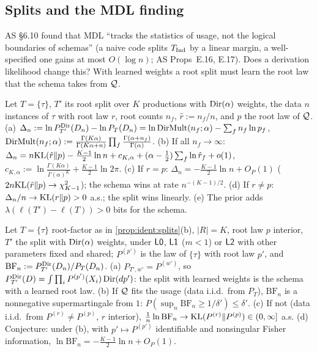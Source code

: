 \subsection{Splits and the MDL finding}\label{sec:ident:mdl}

AS \S6.10 found that MDL ``tracks the statistics of usage, not the logical boundaries of schemas'' (a naive code splits $T_{\mathrm{Ind}}$ by a linear margin, a well-specified one gains at most $O(\log n)$; AS Props~E.16, E.17). Does a derivation likelihood change this? With learned weights a root split must learn the root law that the schema takes from $\mathcal{Q}$.

\begin{proposition}\identbrk{}\label{prop:ident:splitlzero}
Let $T=\{\tau\}$, $T'$ its root split over $K$ productions with $\mathrm{Dir}(\alpha)$ weights, the data $n$ instances of $\tau$ with root law $r$, root counts $n_f$, $\hat r:=n_f/n$, and $p$ the root law of $\mathcal{Q}$.
(a) $\Delta_n:=\ln P^{\mathrm{Dir}}_{T'}(D_n)-\ln P_T(D_n)=\ln\mathrm{DirMult}(n_f;\alpha)-\sum_fn_f\ln p_f$, $\mathrm{DirMult}(n_f;\alpha):=\frac{\Gamma(K\alpha)}{\Gamma(K\alpha+n)}\prod_f\frac{\Gamma(\alpha+n_f)}{\Gamma(\alpha)}$.
(b) If all $n_f\to\infty$: $\Delta_n=n\mathrm{KL}(\hat r\|p)-\frac{K-1}2\ln n+c_{K,\alpha}+(\alpha-\frac12)\sum_f\ln\hat r_f+o(1)$, $c_{K,\alpha}:=\ln\frac{\Gamma(K\alpha)}{\Gamma(\alpha)^K}+\frac{K-1}2\ln2\pi$.
(c) If $r=p$: $\Delta_n=-\frac{K-1}2\ln n+O_P(1)$ ($2n\mathrm{KL}(\hat r\|p)\to\chi^2_{K-1}$); the schema wins at rate $n^{-(K-1)/2}$.
(d) If $r\ne p$: $\Delta_n/n\to\mathrm{KL}(r\|p)>0$ a.s.; the split wins linearly.
(e) The prior adds $\lambda(\ell(T')-\ell(T))>0$ bits for the schema.
\end{proposition}

\begin{proposition}\identbrk{}\label{prop:ident:splitlone}
Let $T=\{\tau\}$ root-factor as in \cref{prop:ident:splits}(b), $|R|=K$, root law $p$ interior, $T'$ the split with $\mathrm{Dir}(\alpha)$ weights, under $\mathord{\mathsf{L0}}$, $\mathord{\mathsf{L1}}$ ($m<1$) or $\mathord{\mathsf{L2}}$ with other parameters fixed and shared; $P^{(p')}$ is the law of $\{\tau\}$ with root law $p'$, and $\mathrm{BF}_n:=P^{\mathrm{Dir}}_{T'}(D_n)/P_T(D_n)$.
(a) $P_{T',w'}=P^{(w')}$, so $P^{\mathrm{Dir}}_{T'}(D)=\int\prod_iP^{(p')}(X_i)\,\mathrm{Dir}(dp')$: the split with learned weights is the schema with a learned root law.
(b) If $\mathcal{Q}$ fits the usage (data i.i.d.\ from $P_T$), $\mathrm{BF}_n$ is a nonnegative supermartingale from $1$: $P(\sup_n\mathrm{BF}_n\ge1/\delta')\le\delta'$.
(c) If not (data i.i.d.\ from $P^{(r)}\ne P^{(p)}$, $r$ interior), $\frac1n\ln\mathrm{BF}_n\to\mathrm{KL}(P^{(r)}\|P^{(p)})\in(0,\infty]$ a.s.
(d) Conjecture: under (b), with $p'\mapsto P^{(p')}$ identifiable and nonsingular Fisher information, $\ln\mathrm{BF}_n=-\frac{K-1}2\ln n+O_P(1)$.
\end{proposition}

